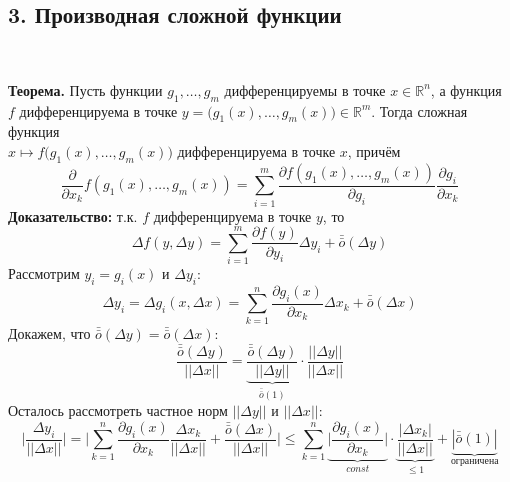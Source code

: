 \documentclass[book, 11pt]{report}
\begin{document}
        \subsection*{3. Производная сложной функции}
        \par{\ }
        \par{\textbf{Теорема. }Пусть функции $g_1,\ldots,g_m$ дифференцируемы в точке $x\in\mathbb{R}^n$, а функция $f$ дифференцируема в точке $y=\bigg(g_1(x),\ldots,g_m(x)\bigg)\in\mathbb{R}^m$. Тогда сложная функция \\ $x\mapsto f\bigg(g_1(x),\ldots,g_m(x)\bigg)$ дифференцируема в точке $x$, причём
        \begin{equation*}
            \frac{\partial}{\partial x_k}f(g_1(x),\ldots,g_m(x))=\sum_{i=1}^m\frac{\partial f(g_1(x),\ldots,g_m(x))}{\partial g_i}\frac{\partial g_i}{\partial x_k}
        \end{equation*}
        \textbf{Доказательство: }т.к. $f$ дифференцируема в точке $y$, то 
        \begin{equation}
            \Delta f(y,\Delta y)=\sum_{i=1}^m\frac{\partial f(y)}{\partial y_i}\Delta y_i+\bar{\bar{o}}(\Delta y)
        \end{equation}
        Рассмотрим $y_i=g_i(x)$ и $\Delta y_i$:
        \begin{equation}
            \Delta y_i=\Delta g_i(x,\Delta x)=\sum_{k=1}^n\frac{\partial g_i(x)}{\partial x_k}\Delta x_k+\bar{\bar{o}}(\Delta x)
        \end{equation}
        Докажем, что $\bar{\bar{o}}(\Delta y)=\bar{\bar{o}}(\Delta x)$:
        \begin{equation}
            \frac{\bar{\bar{o}}(\Delta y)}{||\Delta x||}=\underbrace{\frac{\bar{\bar{o}}(\Delta y)}{||\Delta y||}}_{\bar{\bar{o}}(1)}\cdot\frac{||\Delta y||}{||\Delta x||}
        \end{equation}
        Осталось рассмотреть частное норм $||\Delta y||$ и $||\Delta x||$:
        \begin{equation}
            \bigg|\frac{\Delta y_i}{||\Delta x||}\bigg|=\bigg|\sum_{k=1}^n\frac{\partial g_i(x)}{\partial x_k}\frac{\Delta x_k}{||\Delta x||} +\frac{\bar{\bar{o}}(\Delta x)}{||\Delta x||}\bigg|\leq\sum_{k=1}^n\underbrace{\bigg|\frac{\partial g_i(x)}{\partial x_k}\bigg|}_{const}\cdot\underbrace{\frac{|\Delta x_k|}{||\Delta x||}}_{\leq1}+\underbrace{|\bar{\bar{o}}(1)|}_{\textit{ограничена}}
        \end{equation}
}
\end{document}
